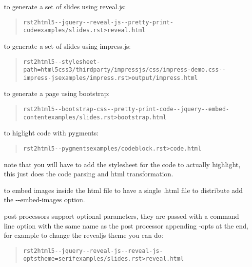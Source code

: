 \documentclass[a4paper]{article}
\begin{document}
to generate a set of slides using reveal.js:

\begin{quote}
\begin{alltt}
rst2html5 -{}-jquery -{}-reveal-js -{}-pretty-print-code examples/slides.rst > reveal.html
\end{alltt}
\end{quote}

to generate a set of slides using impress.js:

\begin{quote}
\begin{alltt}
rst2html5 -{}-stylesheet-path=html5css3/thirdparty/impressjs/css/impress-demo.css -{}-impress-js examples/impress.rst > output/impress.html
\end{alltt}
\end{quote}

to generate a page using bootstrap:

\begin{quote}
\begin{alltt}
rst2html5 -{}-bootstrap-css -{}-pretty-print-code -{}-jquery -{}-embed-content examples/slides.rst > bootstrap.html
\end{alltt}
\end{quote}

to higlight code with pygments:

\begin{quote}
\begin{alltt}
rst2html5 -{}-pygments examples/codeblock.rst > code.html
\end{alltt}
\end{quote}

note that you will have to add the stylesheet for the code to actually highlight, this just does the code parsing and html transformation.

to embed images inside the html file to have a single .html file to distribute
add the -{}-embed-images option.

post processors support optional parameters, they are passed with a command
line option with the same name as the post processor appending \textquotedbl{}-opts\textquotedbl{} at the
end, for example to change the revealjs theme you can do:

\begin{quote}
\begin{alltt}
rst2html5 -{}-jquery -{}-reveal-js -{}-reveal-js-opts theme=serif examples/slides.rst > reveal.html
\end{alltt}
\end{quote}
\end{document}
